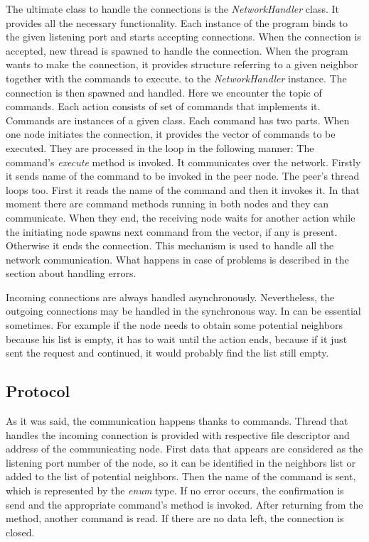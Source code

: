 The ultimate class to handle the connections is the
\textit{NetworkHandler} class. It provides all the necessary
functionality. Each instance of the program binds to the given listening
port and starts accepting connections. When the connection is accepted,
new thread is spawned to handle the connection. When the program wants
to make the connection, it provides structure referring to a given
neighbor together with the commands to execute. to the
\textit{NetworkHandler} instance. The connection is then spawned and
handled. Here we encounter the topic of commands. Each action consists
of set of commands that implements it. Commands are instances of a given
class. Each command has two parts. When one node initiates the
connection, it provides the vector of commands to be executed. They are
processed in the loop in the following manner: The command's
\textit{execute} method is invoked. It communicates over the network.
Firstly it sends name of the command to be invoked in the peer node. The
peer's thread loops too. First it reads the name of the command and then
it invokes it. In that moment there are command methods running in both
nodes and they can communicate. When they end, the receiving node waits
for another action while the initiating node spawns next command from
the vector, if any is present. Otherwise it ends the connection. This
mechanism is used to handle all the network communication. What happens
in case of problems is described in the section about handling errors.

Incoming connections are always handled asynchronously. Nevertheless,
the outgoing connections may be handled in the synchronous way. In can
be essential sometimes. For example if the node needs to obtain some
potential neighbors because his list is empty, it has to wait until the
action ends, because if it just sent the request and continued, it would
probably find the list still empty.

\subsection{Protocol}\label{protocol}

As it was said, the communication happens thanks to commands. Thread
that handles the incoming connection is provided with respective file
descriptor and address of the communicating node. First data that
appears are considered as the listening port number of the node, so it
can be identified in the neighbors list or added to the list of
potential neighbors. Then the name of the command is sent, which is
represented by the \textit{enum} type. If no error occurs, the
confirmation is send and the appropriate command's method is invoked.
After returning from the method, another command is read. If there are
no data left, the connection is closed.

